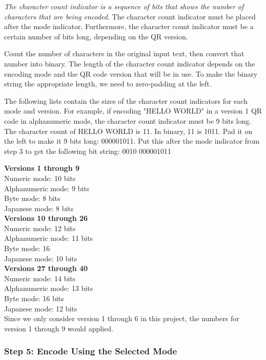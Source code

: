 \emph{The character count indicator is a sequence of bits that shows the number of characters that are being encoded}. The character count indicator must be placed after the mode indicator. Furthermore, the character count indicator must be a certain number of bits long, depending on the QR version.

Count the number of characters in the original input text, then convert that number into binary. The length of the character count indicator depends on the encoding mode and the QR code version that will be in use. To make the binary string the appropriate length, we need to zero-padding at the left.

The following lists contain the sizes of the character count indicators for each mode and version. For example, if encoding "HELLO WORLD" in a version 1 QR code in alphanumeric mode, the character count indicator must be 9 bits long. The character count of HELLO WORLD is 11. In binary, 11 is 1011. Pad it on the left to make it 9 bits long: 000001011. Put this after the mode indicator from step 3 to get the following bit string: 0010 000001011

\textbf{Versions 1 through 9}\\
Numeric mode: 10 bits\\
Alphanumeric mode: 9 bits\\
Byte mode: 8 bits\\
Japanese mode: 8 bits\\
\textbf{Versions 10 through 26}\\
Numeric mode: 12 bits\\
Alphanumeric mode: 11 bits\\
Byte mode: 16\\
Japanese mode: 10 bits\\
\textbf{Versions 27 through 40}\\
Numeric mode: 14 bits\\
Alphanumeric mode: 13 bits\\
Byte mode: 16 bits\\
Japanese mode: 12 bits\\

Since we only consider version 1 through 6 in this project, the numbers for version 1 through 9 would applied.

\subsubsection*{Step 5: Encode Using the Selected Mode}

